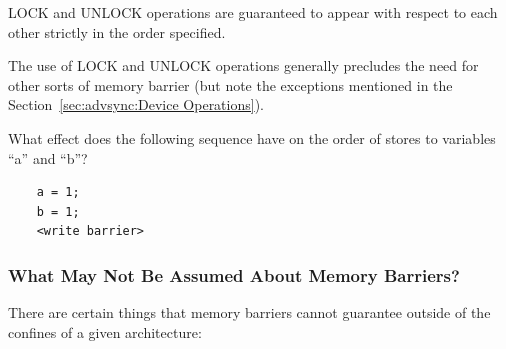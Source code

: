 LOCK and UNLOCK operations are guaranteed to appear with respect to each
other strictly in the order specified.

The use of LOCK and UNLOCK operations generally precludes the need for
other sorts of memory barrier (but note the exceptions mentioned in the
Section~\ref{sec:advsync:Device Operations}).

\QuickQuiz{}
	What effect does the following sequence have on the
	order of stores to variables ``a'' and ``b''?

	\vspace{5pt}
	\begin{minipage}[t]{\columnwidth}
	\small
	\begin{verbatim}
	a = 1;
	b = 1;
	<write barrier>
	\end{verbatim}
	\end{minipage}
 \QuickQuizEnd

\subsubsection{What May Not Be Assumed About Memory Barriers?}
\label{sec:advsync:What May Not Be Assumed About Memory Barriers?}

There are certain things that memory barriers cannot guarantee outside
of the confines of a given architecture:

